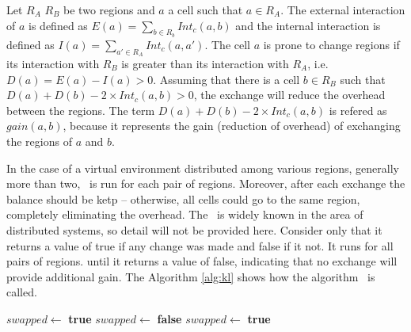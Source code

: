 Let $R_A$ $R_B$ be two regions and $a$ a cell such that $a \in R_A$. The external interaction of $a$ is defined as $E(a) = \sum_{b \in R_b} Int_c (a, b)$ and the internal interaction is defined as $I(a) = \sum_{a' \in R_A} Int_c(a, a')$. The cell $a$ is prone to change regions if its interaction with $R_B$ is greater than its interaction with $R_A$, i.e. $D(a) = E(a) - I(a) > 0$. Assuming that there is a cell $b \in R_B$ such that $D(a) + D(b) - 2 \times Int_c(a, b) > 0 $, the exchange will reduce the overhead between the regions. The term $D(a) + D(b) - 2 \times Int_c(a, b)$ is refered as $gain(a, b)$, because it represents the gain (reduction of overhead) of exchanging the regions of $a$ and $b$.

In the case of a virtual environment distributed among various regions, generally more than two, \kl\ is run for each pair of regions. Moreover, after each exchange the balance should be ketp -- otherwise, all cells could go to the same region, completely eliminating the overhead. The \kl\ is widely known in the area of distributed systems, so detail will not be provided here. Consider only that it returns a value of true if any change was made and false if it not. It runs for all pairs of regions. until it returns a value of false, indicating that no exchange will provide additional gain.
The Algorithm \ref{alg:kl} shows how the algorithm \kl\ is called.


\begin{algorithm}
\caption{\kl}
\label{alg:kl}
\begin{algorithmic}[1]

	\STATE $swapped \leftarrow$ \textbf{true}
		\STATE $swapped \leftarrow$ \textbf{false}
					\STATE $swapped \leftarrow$ \textbf{true}
				\ENDIF
			\ENDFOR
		\ENDFOR
	\ENDWHILE

\end{algorithmic}
\end{algorithm}


